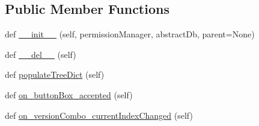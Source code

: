 \subsection*{Public Member Functions}
\begin{DoxyCompactItemize}
\item 
def \mbox{\hyperlink{class_dsg_tools_1_1_user_tools_1_1create_profile_with_profile_manager_1_1_create_profile_with_profile_manager_a4e196baf247adf122d32d7513bcb19cb}{\+\_\+\+\_\+init\+\_\+\+\_\+}} (self, permission\+Manager, abstract\+Db, parent=None)
\item 
def \mbox{\hyperlink{class_dsg_tools_1_1_user_tools_1_1create_profile_with_profile_manager_1_1_create_profile_with_profile_manager_ad5d2f32eab541a9e4085c6df43782e1c}{\+\_\+\+\_\+del\+\_\+\+\_\+}} (self)
\item 
def \mbox{\hyperlink{class_dsg_tools_1_1_user_tools_1_1create_profile_with_profile_manager_1_1_create_profile_with_profile_manager_a0c8dfcd248faa5e16477b0e78776bedf}{populate\+Tree\+Dict}} (self)
\item 
def \mbox{\hyperlink{class_dsg_tools_1_1_user_tools_1_1create_profile_with_profile_manager_1_1_create_profile_with_profile_manager_ab978fc49061dfb16a4ea8cb6d9144217}{on\+\_\+button\+Box\+\_\+accepted}} (self)
\item 
def \mbox{\hyperlink{class_dsg_tools_1_1_user_tools_1_1create_profile_with_profile_manager_1_1_create_profile_with_profile_manager_ad75534e9e2defef7f7ecfa9d157475d0}{on\+\_\+version\+Combo\+\_\+current\+Index\+Changed}} (self)
\end{DoxyCompactItemize}
